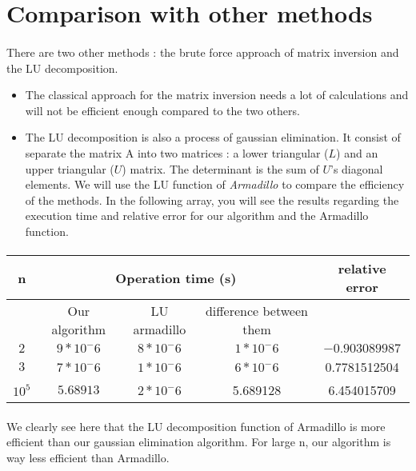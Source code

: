 \documentclass[a4paper, twoside, 11pt]{report}
\theoremstyle{theorem}
\theoremstyle{remark}
\theoremstyle{exemple}
\begin{document}
	\section{Comparison with other methods}
	\paragraph{} There are two other methods : the brute force approach of matrix inversion and the LU decomposition.
		\begin{itemize}
			\item{The classical approach for the matrix inversion needs a lot of calculations and will not be efficient enough compared to the two others.}
			\item{The LU decomposition is also a process of gaussian elimination. It consist of separate the matrix A into two matrices : a lower triangular ($L$) and an upper triangular ($U$) matrix. The determinant is the sum of $U$'s diagonal elements. We will use the LU function of \emph{Armadillo} to compare the efficiency of the methods. In the following array, you will see the results regarding the execution time and relative error for our algorithm and the Armadillo function.}
		\end{itemize}
		\paragraph{}
	
	\begin{center}
	\begin{tabular}{|*{5}{c|}}
  \hline
  n  & \multicolumn{3}{|c|}{Operation time (s)}  & relative error \\
	\hline
	 & Our algorithm & LU armadillo & difference between them & \\
  \hline
  $2$ & $9*10^-6$   & $8*10^-6$ & $1*10^-6$ & $-0.903089987$ \\
	\hline
  $3$ & $7*10^-6$ & $1*10^-6$ & $6*10^-6$ & 0.7781512504 \\
  \hline
	$10^5$ & $5.68913$ & $2*10^-6$ & 5.689128 & 6.454015709 \\
	\hline	
\end{tabular}
\end{center}
	
	\paragraph{}We clearly see here that the LU decomposition function of Armadillo is more efficient than our gaussian elimination algorithm. For large n, our algorithm is way less efficient than Armadillo. 
\end{document}
